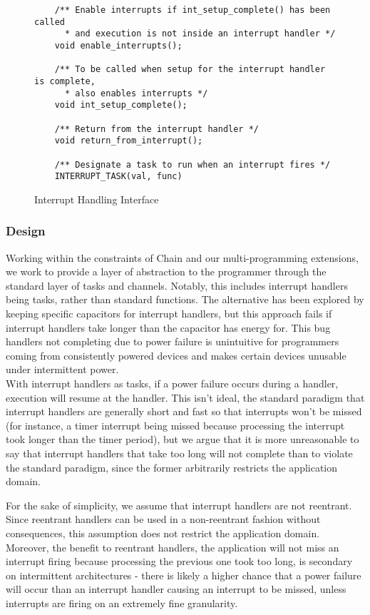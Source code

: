 \documentclass[11pt]{sensys-proc}
\newcommand{\chain}{Chain\xspace}
\begin{document}
\begin{figure*}
\begin{minipage}[b]{0.49\textwidth}
\begin{lstlisting}
    /** Enable interrupts if int_setup_complete() has been called
      * and execution is not inside an interrupt handler */
    void enable_interrupts();

    /** To be called when setup for the interrupt handler is complete,
      * also enables interrupts */
    void int_setup_complete();

    /** Return from the interrupt handler */
    void return_from_interrupt();

    /** Designate a task to run when an interrupt fires */
    INTERRUPT_TASK(val, func)
\end{lstlisting}
\caption{Interrupt Handling Interface}\label{label-a}
\end{minipage}\hfill
\end{figure*}

\subsubsection{Design}
Working within the constraints of \chain and our multi-programming extensions,
we work to provide a layer of abstraction to the programmer through the standard
layer of tasks and channels. Notably, this includes interrupt handlers being
tasks, rather than standard functions. The alternative has been explored
by keeping specific capacitors for interrupt handlers\cite{Aware}, but this
approach fails if interrupt handlers take longer than the capacitor has
energy for. This bug handlers not completing due to power failure is
unintuitive for programmers coming from consistently powered devices and
makes certain devices unusable under intermittent power.\\
With interrupt handlers as tasks, if a power failure occurs during a
handler, execution will resume at the handler. This isn't ideal, the
standard paradigm that interrupt handlers are generally short and fast
so that interrupts won't be missed (for instance, a timer interrupt
being missed because processing the interrupt took longer than the
timer period), but we argue that it is more unreasonable to say
that interrupt handlers that take too long will not complete than
to violate the standard paradigm, since the former arbitrarily restricts
the application domain.


For the sake of simplicity, we assume that interrupt handlers are not
reentrant. Since reentrant handlers can be used in a non-reentrant fashion
without consequences, this assumption does not restrict the application domain.
Moreover, the benefit to reentrant handlers, the application will not miss an
interrupt firing because processing the previous one took too long, is
secondary on intermittent architectures - there is likely a higher chance that
a power failure will occur than an interrupt handler causing an interrupt to be
missed, unless interrupts are firing on an extremely fine granularity.
\end{document}
